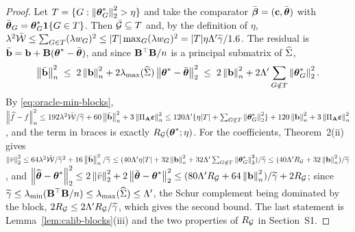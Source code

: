 \begin{proof}
Let $T = \{G : \norm{\thetastar_{G}}_{2}^{2} > \eta\}$ and take the comparator
$\bar\bbeta = (\bc,\thbar)$ with $\thbar_{G} = \thetastar_{G}\mathbf{1}\{G\in T\}$.
Then $\Gbar \subseteq T$ and, by the definition of $\eta$,
$\pen^{2}\bar\Wcal \le \sum_{G\in T}(\pen w_{G})^{2} \le
|T|\max_{G}(\pen w_{G})^{2} = |T|\eta\Lambda'\gtil/1.6$. The residual is
$\bbar = \bb + \Bmat(\thetastar-\thbar)$, and since $\Bmat\T\Bmat/n$ is a
principal submatrix of $\Gramhat$,
\[
  \normn{\bbar}^{2} \;\le\; 2\normn{\bb}^{2}
  + 2\lmaxx(\Gramhat)\norm{\thetastar-\thbar}_{2}^{2}
  \;\le\; 2\normn{\bb}^{2} + 2\Lambda'\sum_{G\notin T}\norm{\thetastar_{G}}_{2}^{2}.
\]
By \eqref{eq:oracle-min-blocks},
$\normn{\widehat{f}-f}^{2} \le 192\pen^{2}\bar\Wcal/\gtil + 60\normn{\bbar}^{2}
+ 3\normn{\PA\bveps}^{2} \le 120\Lambda'\{\eta|T| +
\sum_{G\notin T}\norm{\thetastar_{G}}_{2}^{2}\} + 120\normn{\bb}^{2} +
3\normn{\PA\bveps}^{2}$, and the term in braces is exactly
$\Rid(\thetastar;\eta)$. For the coefficients, Theorem~2(ii) gives
$\norm{\vbar}_{2}^{2} \le 64\pen^{2}\bar\Wcal/\gtil^{2} +
16\normn{\bbar}^{2}/\gtil \le (40\Lambda'\eta|T| + 32\normn{\bb}^{2} +
32\Lambda'\sum_{G\notin T}\norm{\thetastar_{G}}_{2}^{2})/\gtil \le
(40\Lambda'\Rid + 32\normn{\bb}^{2})/\gtil$, and
$\norm{\thetahat-\thetastar}_{2}^{2} \le 2\norm{\vbar}_{2}^{2} +
2\norm{\thbar-\thetastar}_{2}^{2} \le (80\Lambda'\Rid +
64\normn{\bb}^{2})/\gtil + 2\Rid$; since $\gtil \le \lmin(\Bmat\T\Bmat/n) \le
\lmaxx(\Gramhat) \le \Lambda'$, the Schur complement being dominated by the
block, $2\Rid \le 2\Lambda'\Rid/\gtil$, which gives the second bound. The last
statement is Lemma~\ref{lem:calib-blocks}(iii) and the two properties of
$\Rid$ in Section~S1.
\end{proof}


